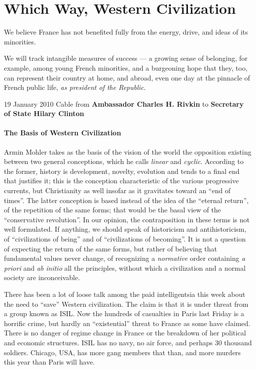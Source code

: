 \section{Which Way, Western Civilization}

\begin{quotex}
We believe France has not benefited fully from the energy, drive, and ideas of its minorities.

We will track intangible measures of success --- a growing sense of belonging, for example, among young French minorities, and a burgeoning hope that they, too, can represent their country at home, and abroad, even one day at the pinnacle of French public life, \emph{as president of the Republic}.

19 January 2010 Cable from \textbf{Ambassador Charles H. Rivkin} to \textbf{Secretary of State Hilary Clinton}
\end{quotex}


\paragraph{The Basis of Western Civilization}


\begin{quotex}
Armin Mohler takes as the basis of the vision of the world the opposition existing between two general conceptions, which he calls \emph{linear} and \emph{cyclic}. According to the former, history is development, novelty, evolution and tends to a final end that justifies it; this is the conception characteristic of the various progressive currents, but Christianity as well insofar as it gravitates toward an ``end of times''. The latter conception is based instead of the idea of the ``eternal return'', of the repetition of the same forms; that would be the basal view of the ``conservative revolution''. In our opinion, the contraposition in these terms is not well formulated. If anything, we should speak of historicism and antihistoricism, of ``civilizations of being'' and of ``civilizations of becoming''. It is not a question of expecting the return of the same forms, but rather of believing that fundamental values never change, of recognizing a \emph{normative} order containing \emph{a priori} and \emph{ab initio} all the principles, without which a civilization and a normal society are inconceivable.
\end{quotex}


There has been a lot of loose talk among the paid intelligentsia this week about the need to ``save'' Western civilization. The claim is that it is under threat from a group known as ISIL. Now the hundreds of casualties in Paris last Friday is a horrific crime, but hardly an ``existential'' threat to France as some have claimed. There is no danger of regime change in France or the breakdown of her political and economic structures. ISIL has no navy, no air force, and perhaps 30 thousand soldiers. Chicago, USA, has more gang members that than, and more murders this year than Paris will have.

